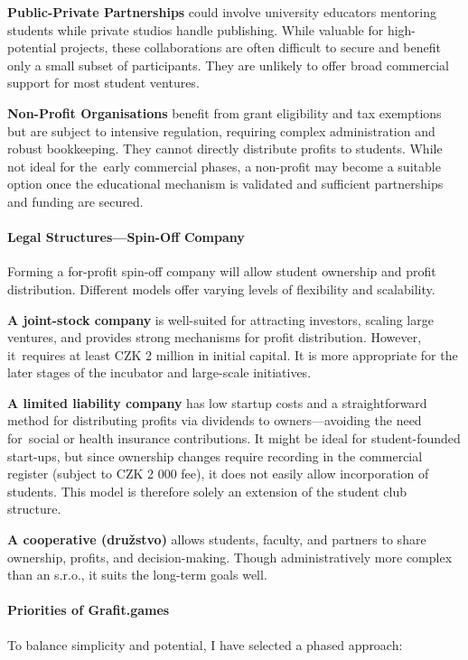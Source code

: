 \textbf{Public-Private Partnerships} could involve university educators mentoring students while private studios handle publishing. While valuable for high-potential projects, these collaborations are often difficult to secure and benefit only a small subset of participants. They are unlikely to offer broad commercial support for most student ventures.

\textbf{Non-Profit Organisations} benefit from grant eligibility and tax exemptions but are subject to intensive regulation, requiring complex administration and robust bookkeeping. They cannot directly distribute profits to students. While not ideal for the~early commercial phases, a non-profit may become a suitable option once the educational mechanism is validated and sufficient partnerships and funding are secured.

\paragraph{Legal Structures—Spin-Off Company}
Forming a for-profit spin-off company will allow student ownership and profit distribution. Different models offer varying levels of flexibility and scalability.

\textbf{A joint-stock company} is well-suited for attracting investors, scaling large ventures, and provides strong mechanisms for profit distribution. However, it~requires at least CZK 2 million in initial capital. It is more appropriate for the later stages of the incubator and large-scale initiatives.

\textbf{A limited liability company} has low startup costs and a straightforward method for distributing profits via dividends to owners—avoiding the need for~social or health insurance contributions. It might be ideal for student-founded start-ups, but since ownership changes require recording in the commercial register (subject to CZK 2 000 fee), it does not easily allow incorporation of students. This model is therefore solely an extension of the student club structure.

\textbf{A cooperative (družstvo)} allows students, faculty, and partners to share ownership, profits, and decision-making. Though administratively more complex than an s.r.o., it suits the long-term goals well.

\paragraph{Priorities of Grafit.games}
To balance simplicity and potential, I have selected a phased approach:

